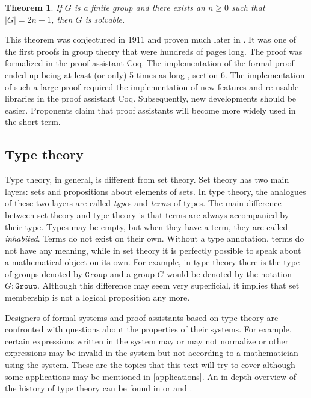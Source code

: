 \documentclass[12pt,a4paper,twoside,xetex,draft]{book}
\newcommand{\keyword}[1]{\emph{#1}\index{#1}}
\newtheorem{theorem}{Theorem}[section]
\newcommand{\op}[1]{\mathtt{#1}}
\begin{document}
\begin{theorem}
If $G$ is a finite group and there exists an $n \geq 0$ such that $|G| = 2n+1$, then $G$ is solvable.
\end{theorem}

This theorem was conjectured in 1911 and proven much later in \cite{Feit1963}. It was one of the first proofs in group theory that were hundreds of pages long. The proof was formalized in the proof assistant Coq. The implementation of the formal proof ended up being at least (or only) 5 times as long \cite{Gonthier2013}, section 6. The implementation of such a large proof required the implementation of new features and re-usable libraries in the proof assistant Coq. Subsequently, new developments should be easier. Proponents claim that proof assistants will become more widely used in the short term.






\subsection{Type theory}

Type theory, in general, is different from set theory. Set theory has two main layers: sets and propositions about elements of sets. In type theory, the analogues of these two layers are called \keyword{type}s and \keyword{term}s of types. The main difference between set theory and type theory is that terms are always accompanied by their type. Types may be empty, but when they have a term, they are called \keyword{inhabited}. Terms do not exist on their own. Without a type annotation, terms do not have any meaning, while in set theory it is perfectly possible to speak about a mathematical object on its own. For example, in type theory there is the type of groups denoted by $\op{Group}$ and a group $G$ would be denoted by the notation $G : \op{Group}$. Although this difference may seem very superficial, it implies that set membership is not a logical proposition any more. 

Designers of formal systems and proof assistants based on type theory are confronted with questions about the properties of their systems. For example, certain expressions written in the system may or may not normalize or other expressions may be invalid in the system but not according to a mathematician using the system. These are the topics that this text will try to cover although some applications may be mentioned in \cref{applications}. An in-depth overview of the history of type theory can be found in \cite{Coquand2013oct} or \cite{Constable2011} and \cite{Constable2015July}.
\end{document}
